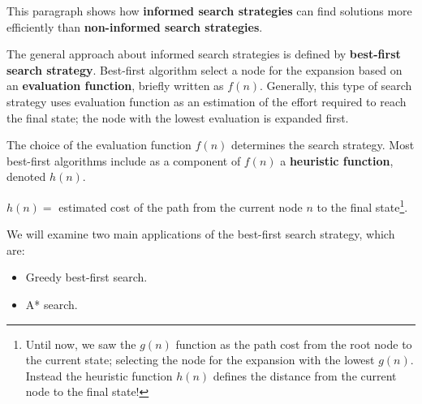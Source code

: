 This paragraph shows how \textbf{informed search strategies} can find solutions more efficiently than \textbf{non-informed search strategies}.

The general approach about informed search strategies is defined by \textbf{best-first search strategy}. Best-first algorithm select a node for the expansion based on an 
\textbf{evaluation function}, briefly written as $f(n)$. Generally, this type of search strategy uses evaluation function as an estimation of the effort required to reach the 
final state; the node with the lowest evaluation is expanded first. \vspace{3.5pt}

The choice of the evaluation function $f(n)$ determines the search strategy. Most best-first algorithms include as a component of $f(n)$ a \textbf{heuristic function}, denoted
$h(n)$. \vspace{3.5pt}
\begin{center}
    $h(n) =$ estimated cost of the path from the current node $n$ to the final state\footnote{Until now, we saw the $g(n)$ function as the path cost from the root node to the
    current state; selecting the node for the expansion with the lowest $g(n)$. Instead the heuristic function $h(n)$ defines the distance from the current node to the final state!}.
\end{center}
We will examine two main applications of the best-first search strategy, which are:
\begin{itemize}
    \renewcommand{\labelitemi}{-}
    \item Greedy best-first search.
    \item A* search.
\end{itemize} 